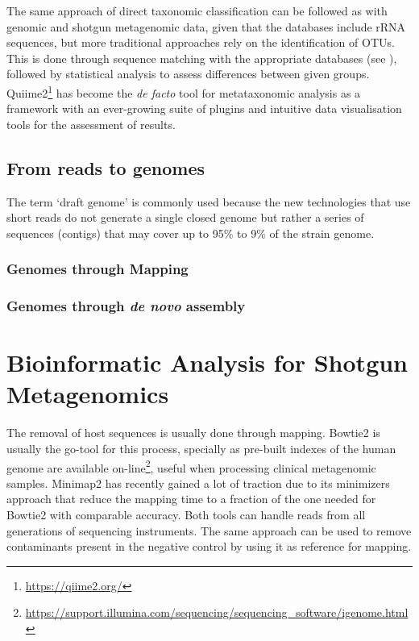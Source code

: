 The same approach of direct taxonomic classification can be followed as with genomic and shotgun metagenomic data, given that the databases include rRNA sequences, but more traditional approaches rely on the identification of OTUs. This is done through sequence matching with the appropriate databases  (see ), followed by statistical analysis to assess differences between given groups. Quiime2\footnote{\url{https://qiime2.org/}} \citep{bolyen_reproducible_2019} has become the \textit{de facto} tool for metataxonomic analysis as a framework with an ever-growing suite of plugins and intuitive data visualisation tools for the assessment of results. 

\subsection{From reads to genomes}

The term ‘draft genome’ is commonly used because the new technologies that use short reads do not generate a single closed genome but rather a series of sequences (contigs) that may cover up to 95\% to 9\% of the strain genome.

\subsubsection{Genomes through Mapping}

\subsubsection{Genomes through \textit{de novo} assembly}

\section{Bioinformatic Analysis for Shotgun Metagenomics}

The removal of host sequences is usually done through mapping. Bowtie2 \citep{langmead_fast_2012} is usually the go-tool for this process, specially as pre-built indexes of the human genome are available on-line\footnote{\url{https://support.illumina.com/sequencing/sequencing\_software/igenome.html}}, useful when processing clinical metagenomic samples. Minimap2 \citep{li_minimap2_2018} has recently gained a lot of traction due to its minimizers approach that reduce the mapping time to a fraction of the one needed for Bowtie2 with comparable accuracy. Both tools can handle reads from all generations of sequencing instruments. The same approach can be used to remove contaminants present in the negative control by using it as reference for mapping. 

